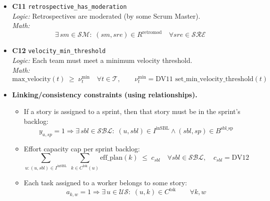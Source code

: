 \documentclass[11pt,a4paper]{article}
\begin{document}
\begin{itemize}[leftmargin=2em]
  \item \textbf{C11} \texttt{retrospective\_has\_moderation} \\
  \emph{Logic:} Retrospectives are moderated (by some Scrum Master). \\
  \emph{Math:}
  \[
    \exists\, sm\in\mathcal{SM}:\; (sm,sre)\in R^{\mathrm{retromod}} \quad\forall sre\in\mathcal{SRE}
  \]

  \item \textbf{C12} \texttt{velocity\_min\_threshold} \\
  \emph{Logic:} Each team must meet a minimum velocity threshold. \\
  \emph{Math:}
  \[
    \mathrm{max\_velocity}(t)\;\ge\; \nu^{\min}_t \quad\forall t\in\mathcal{T},
    \qquad \nu^{\min}_t=\text{DV11 } \mathrm{set\_min\_velocity\_threshold}(t)
  \]

  \item \textbf{Linking/consistency constraints (using relationships).}
  \begin{itemize}
    \item If a story is assigned to a sprint, then that story must be in the sprint's backlog:
    \[
       y_{u,sp}=1 \Rightarrow \exists\, sbl\in\mathcal{SBL}:\; (u,sbl)\in I^{\mathrm{inSBL}} \wedge (sbl,sp)\in B^{\mathrm{sbl\_sp}}
    \]
    \item Effort capacity cap per sprint backlog:
    \[
       \sum_{u:(u,sbl)\in I^{\mathrm{inSBL}}}\; \sum_{k\in C^{\mathrm{tsk}}(u)} \mathrm{eff\_plan}(k) \;\le\; c_{sbl}
       \quad \forall sbl\in\mathcal{SBL},\quad c_{sbl}=\text{DV12}
    \]
    \item Each task assigned to a worker belongs to some story:
    \[
       a_{k,w}=1 \Rightarrow \exists\, u\in\mathcal{US}:\; (u,k)\in C^{\mathrm{tsk}} \qquad \forall k,w
    \]
  \end{itemize}
\end{itemize}

\end{document}
